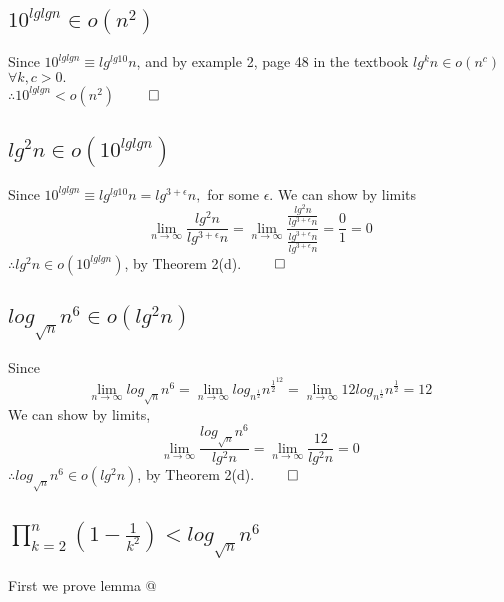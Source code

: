 \documentclass{article}
\begin{document}
        \subsection{$10^{lg lg n} \in o(n^{2})$}
        Since $10^{lg lg n} \equiv lg^{lg 10} n$, and by example 2, page 48 in the textbook $lg^{k}n \in o(n^{c})$ $\forall k, c > 0.$ \\
        $\therefore 10^{lg lg n} < o(n^{2})$ $\qed$
        \subsection{$lg^{2}n \in o(10^{lg lg n})$}
        Since $10^{lg lg n} \equiv lg^{lg 10} n = lg^{3 + \epsilon}n,$ for some $\epsilon$. We can show by limits
        \[\lim_{n \to \infty} \frac{lg^{2}n}{lg^{3 + \epsilon}n} = \lim_{n \to \infty} \frac{\frac{lg^{2}n}{lg^{3 + \epsilon}n}}{\frac{lg^{3 + \epsilon}n}{lg^{3 + \epsilon}n}} = \frac{0}{1} = 0\]
        $\therefore lg^{2}n \in o(10^{lg lg n})$, by Theorem 2(d). $\qed$
        \subsection{$log_{\sqrt{n}}n^{6} \in o(lg^{2}n)$}
        Since \[\lim_{n \to \infty}log_{\sqrt{n}}n^{6} = \lim_{n \to \infty}log_{n^{\frac{1}{2}}}n^{\frac{1}{2}^{12}} = \lim_{n \to \infty}12log_{n^{\frac{1}{2}}}n^{\frac{1}{2}} = 12\]
          We can show by limits,
          \[\lim_{n \to \infty}\frac{log_{\sqrt{n}}n^{6}}{lg^{2}n} = \lim_{n \to \infty}\frac{12}{lg^{2}n} = 0\]
          $\therefore log_{\sqrt{n}}n^{6} \in o(lg ^{2}n)$, by Theorem 2(d). $\qed$
          \subsection{$\prod_{k=2}^{n}(1 - \frac{1}{k^{2}}) < log_{\sqrt{n}}n^{6}$}
          First we prove lemma @
\end{document}
